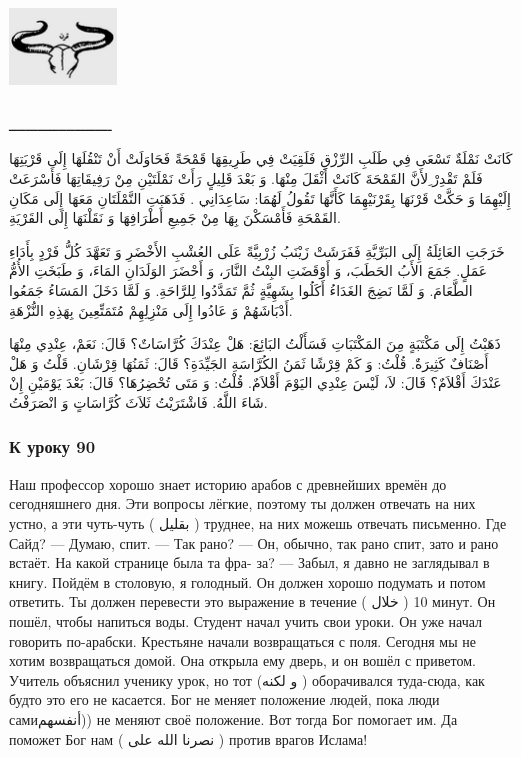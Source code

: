 \documentclass[a5paper]{article}
\begin{document}
\begin{center}
\includegraphics[width=1.1252in,height=1.0547in]{MuhammadBagauddinlatinized-img286.png}
\end{center}
ـــــــــــــــــــــــــ

كَانَتْ نَمْلَةٌ تَسْعَى فِي طَلَبِ الرِّزْقِ فَلَقِيَتْ فِي طَرِيقِهَا قَمْحَةً فَحَاوَلَتْ أَنْ تَنْقُلَهَا إِلَى قَرْيَتِهَا فَلَمْ تَقْدِرْ ِلأَنَّ القَمْحَةَ كَانَتْ أَثْقَلَ مِنْهَا. وَ بَعْدَ قَلِيلٍ رَأَتْ نَمْلَتَيْنِ مِنْ رَفِيقَاتِهَا فَأَسْرَعَتْ إِلَيْهِمَا وَ حَكَّتْ قَرْنَهَا بِقَرْنَيْهِمَا كَأَنَّهَا تَقُولُ لَهُمَا: سَاعِدَانِي . فَذَهَبَتِ النَّمْلَتَانِ مَعَهَا إِلَى مَكَانِ القَمْحَةِ فَأَمْسَكْنَ بِهَا مِنْ جَمِيعِ أَطْرَافِهَا وَ نَقَلْنَهَا إِلَى القَرْيَةِ.

خَرَجَتِ العَائِلَةُ إِلَى البَرِّيَّةِ فَفَرَشَتْ زَيْنَبُ زُرْبِيَّةً عَلَى العُشْبِ الأَخْضَرِ وَ تَعَهَّدَ كُلُّ فَرْدٍ بِأَدَاءِ عَمَلٍ. جَمَعَ الأَبُ الحَطَبَ، وَ أَوْقَضَتِ البِنْتُ النَّارَ، وَ أَحْضَرَ الوَلَدَانِ المَاءَ، وَ طَبَخَتِ الأُمُّ الطَّعَامَ. وَ لَمَّا نَضِجَ الغَدَاءُ أَكَلُوا بِشَهِيَّةٍ ثُمَّ تَمَدَّدُوا لِلرَّاحَةِ. وَ لَمَّا دَخَلَ المَسَاءُ جَمَعُوا أَدْبَاشَهُمْ وَ عَادُوا إِلَى مَنْزِلِهِمْ مُتَمَتِّعِينَ بِهَذِهِ النُّزْهَةِ.

ذَهَبْتُ إِلَى مَكْتَبَةٍ مِنَ المَكْتَبَاتِ فَسَأَلْتُ البَائِعَ: هَلْ عِنْدَكَ كُرَّاسَاتٌ؟ قَالَ: نَعَمْ، عِنْدِي مِنْهَا أَصْنَافٌ كَثِيرَةٌ. قُلْتُ: وَ كَمْ قِرْشًا ثَمَنُ الكُرَّاسَةِ الجَيِّدَةِ؟ قَالَ: ثَمَنُهَا قِرْشَانِ. قَلْتُ وَ هَلْ عَنْدَكَ أَقْلاَمٌ؟ قَالَ: لاَ، لَيْسَ عِنْدِي اليَوْمَ أَقْلاَمٌ. قُلْتُ: وَ مَتَى تُحْضِرُهَا؟ قَالَ: بَعْدَ يَوْمَيْنِ إِنْ شَاءَ اللَّهُ. فَاشْتَرَيْتُ ثَلاَثَ كُرَّاسَاتٍ وَ انْصَرَفْتُ.

\subsubsection{К уроку 90}
Наш профессор хорошо знает историю арабов с древнейших времён до сегодняшнего дня. Эти вопросы лёгкие, поэтому ты должен отвечать на них устно, а эти чуть-чуть ( بقليل ) труднее, на них можешь отвечать письменно. Где Сайд? — Думаю, спит. — Так рано? — Он, обычно, так рано спит, зато и рано встаёт. На какой странице была та фра- за? — Забыл, я давно не заглядывал в книгу. Пойдём в столовую, я голодный. Он должен хорошо подумать и потом ответить. Ты должен перевести это выражение в течение ( خلال ) 10 минут. Он пошёл, чтобы напиться воды. Студент начал учить свои уроки. Он уже начал говорить по-арабски. Крестьяне начали возвращаться с поля. Сегодня мы не хотим возвращаться домой. Она открыла ему дверь, и он вошёл с приветом. Учитель объяснил ученику урок, но тот (و لكنه ) оборачивался туда-сюда, как будто это его не касается. Бог не меняет положение людей, пока люди самиأنفسهم)) не меняют своё положение. Вот тогда Бог помогает им. Да поможет Бог нам ( نصرنا الله على ) против врагов Ислама!
\end{document}
